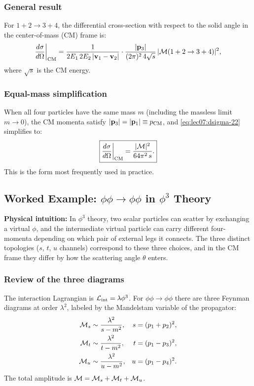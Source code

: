 \documentclass[../main.tex]{subfiles}
\begin{document}
\subsubsection*{General result}

For $1+2\to3+4$, the differential cross-section with respect to the solid angle in the center-of-mass (CM) frame is:
\begin{equation}
  \frac{d\sigma}{d\Omega}\bigg|_{\rm CM}
  = \frac{1}{2E_1\,2E_2\,|\mathbf{v}_1-\mathbf{v}_2|}
    \cdot \frac{|\mathbf{p}_3|}{(2\pi)^2\,4\sqrt{s}}\,
    |\mathcal{M}(1+2\to3+4)|^2,
  \label{eq:lec07:dsigma-22}
\end{equation}
where $\sqrt{s}$ is the CM energy.

\subsubsection*{Equal-mass simplification}

When all four particles have the same mass $m$ (including the massless limit $m\to0$), the CM momenta satisfy $|\mathbf{p}_3| = |\mathbf{p}_1| \equiv p_{\rm CM}$, and \eqref{eq:lec07:dsigma-22} simplifies to:
\begin{equation}
  \boxed{
  \frac{d\sigma}{d\Omega}\bigg|_{\rm CM}
  = \frac{|\mathcal{M}|^2}{64\pi^2\,s}.
  }
  \label{eq:lec07:dsigma-equal-mass}
\end{equation}
This is the form most frequently used in practice.

\subsection*{Worked Example: $\phi\phi\to\phi\phi$ in $\phi^3$ Theory}

\noindent\textbf{Physical intuition:} In $\phi^3$ theory, two scalar particles can scatter by exchanging a virtual $\phi$, and the intermediate virtual particle can carry different four-momenta depending on which pair of external legs it connects.  The three distinct topologies ($s$, $t$, $u$ channels) correspond to these three choices, and in the CM frame they differ by how the scattering angle $\theta$ enters.

\subsubsection*{Review of the three diagrams}

The interaction Lagrangian is $\mathcal{L}_{\rm int} = \lambda\phi^3$.  For $\phi\phi\to\phi\phi$ there are three Feynman diagrams at order $\lambda^2$, labeled by the Mandelstam variable of the propagator:
\begin{align}
  \mathcal{M}_s &\sim \frac{\lambda^2}{s - m^2}, & s &= (p_1+p_2)^2, \label{eq:lec07:Ms}\\
  \mathcal{M}_t &\sim \frac{\lambda^2}{t - m^2}, & t &= (p_1-p_3)^2, \label{eq:lec07:Mt}\\
  \mathcal{M}_u &\sim \frac{\lambda^2}{u - m^2}, & u &= (p_1-p_4)^2. \label{eq:lec07:Mu}
\end{align}
The total amplitude is $\mathcal{M} = \mathcal{M}_s + \mathcal{M}_t + \mathcal{M}_u$.
\end{document}
